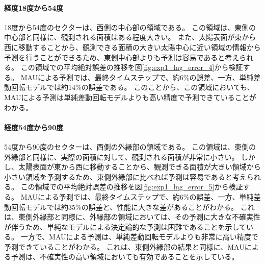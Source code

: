           \paragraph{経度18度から54度}
          18度から54度のセクターは、西側の中心部の領域である。
          この領域は、東側の中心部と同様に、観測される面積はある程度大きい。
          また、太陽表面が東から西に移動することから、観測できる面積の大きい太陽中心に近い領域の情報から予測を行うことができるため、東側中心部よりも予測は容易であると考えられる。
          この領域での平均絶対誤差の推移を図\ref{fig:exp1_lng_error_4}から検証する。
          MAUによる予測では、最終タイムステップで、約6\%の誤差、一方、単純差動回転モデルでは約14\%の誤差である。
          このことから、この領域においても、MAUによる予測は単純差動回転モデルよりも高い精度で予測できていることがわかる。

          \paragraph{経度54度から90度}
          54度から90度のセクターは、西側の外縁部の領域である。
          この領域は、東側の外縁部と同様に、実際の面積に対して、観測される面積が非常に小さい。
          しかし、太陽表面が東から西に移動することから、観測できる面積が大きい領域から小さい領域を予測するため、東側外縁部に比べれば予測は容易であると考えられる。
          この領域での平均絶対誤差の推移を図\ref{fig:exp1_lng_error_5}から検証する。
          MAUによる予測では、最終タイムステップで、約6\%の誤差、一方、単純差動回転モデルでは約35\%の誤差と、性能に大きな差があることがわかる。
          これは、東側外縁部と同様に、外縁部の領域においては、その予測に大きな不確実性が伴うため、単純なモデルによる決定論的な予測は困難であることを示している。
          一方で、MAUによる予測は、単純差動回転モデルよりも非常に高い精度で予測できていることがわかる。
          これは、東側外縁部の結果と同様に、MAUによる予測は、不確実性の高い領域においても有効であることを示している。

